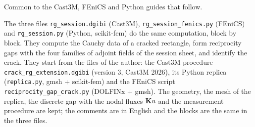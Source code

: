   {Common to the Cast3M, FEniCS and Python guides that follow.}

The three files \texttt{rg\_session.dgibi} (Cast3M),
\texttt{rg\_session\_fenics.py} (FEniCS) and \texttt{rg\_session.py} (Python,
scikit-fem) do the same computation, block by block. They compute the
Cauchy data of a cracked rectangle, form reciprocity gaps with the four
families of adjoint fields of the session sheet, and identify the crack.
They start from the files of the author: the Cast3M procedure
\texttt{crack\_rg\_extension.dgibi} (version 3, Cast3M 2026), its Python
replica (\texttt{replica.py}, gmsh + scikit-fem) and the FEniCS script
\texttt{reciprocity\_gap\_crack.py} (DOLFINx + gmsh). The geometry, the
mesh of the replica, the discrete gap with the nodal fluxes $\mathbf{K}u$ and the
measurement procedure are kept; the comments are in English and the
blocks are the same in the three files.

